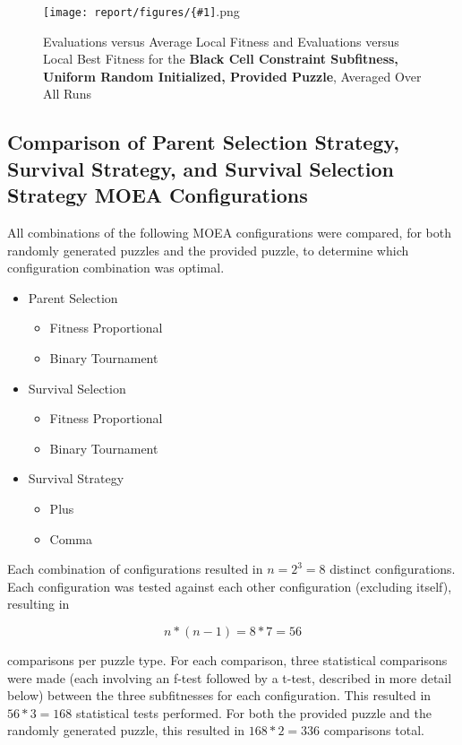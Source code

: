 \documentclass[11pt]{article}
\newcommand{\fitnessplotcaption}[1]{\caption{Evaluations versus Average Local Fitness and Evaluations versus 
    Local Best Fitness for the \textbf{{#1}}, Averaged Over All Runs}}
\newcommand{\addgraphic}[1]{\centerline{\texttt{[image: report/figures/\{\#1]}.png}}}
\begin{document}
\begin{figure}[H]
    \addgraphic{website_puzzle_uniform_random_init_black_cell_constr__graph}
    \fitnessplotcaption{Black Cell Constraint Subfitness, Uniform Random Initialized, Provided Puzzle}
    \label{fig:website_u_black}
\end{figure}


\subsection{Comparison of Parent Selection Strategy, Survival Strategy, and Survival Selection Strategy
MOEA Configurations}

All combinations of the following MOEA configurations were compared, for both randomly generated 
puzzles and the provided puzzle, to determine which configuration combination was optimal.

\begin{itemize}
    \item Parent Selection
    \begin{itemize}
        \item Fitness Proportional
        \item Binary Tournament
    \end{itemize}

    \item Survival Selection
    \begin{itemize}
        \item Fitness Proportional
        \item Binary Tournament
    \end{itemize}

    \item Survival Strategy 
    \begin{itemize}
        \item Plus
        \item Comma
    \end{itemize}
\end{itemize}

Each combination of configurations resulted in \begin{math} n = 2^3 = 8 \end{math} distinct configurations. Each configuration
was tested against each other configuration (excluding itself), resulting in  

\[ n * (n - 1) = 8 * 7 = 56 \]

comparisons per puzzle type. For each comparison, three statistical comparisons were made (each 
involving an f-test followed by a t-test, described in more detail below) between the three 
subfitnesses for each configuration. This resulted in \begin{math} 56 * 3 = 168 \end{math}
statistical tests performed. For both the provided puzzle and the randomly generated puzzle, 
this resulted in \begin{math} 168 * 2 = 336 \end{math} comparisons total.
\end{document}
